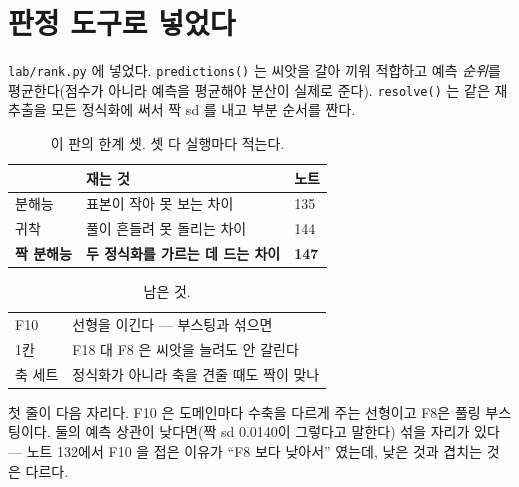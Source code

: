 \documentclass[10pt]{article}
\begin{document}


\section{판정 도구로 넣었다}

\texttt{lab/rank.py} 에 넣었다. \texttt{predictions()} 는 씨앗을 갈아
끼워 적합하고 예측 \emph{순위}를 평균한다(점수가 아니라 예측을 평균해야
분산이 실제로 준다). \texttt{resolve()} 는 같은 재추출을 모든 정식화에
써서 짝 sd 를 내고 부분 순서를 짠다.

\begin{table}[t]
\centering\tsize
\caption{이 판의 한계 셋. 셋 다 실행마다 적는다.}
\begin{tabular}{lll}
\toprule
& 재는 것 & 노트 \\
\midrule
분해능 & 표본이 작아 못 보는 차이 & 135 \\
귀착 & 풀이 흔들려 못 돌리는 차이 & 144 \\
\textbf{짝 분해능} & \textbf{두 정식화를 가르는 데 드는 차이} & \textbf{147} \\
\bottomrule
\end{tabular}
\end{table}

\begin{table}[t]
\centering\tsize
\caption{남은 것.}
\begin{tabular}{ll}
\toprule
F10 & 선형을 이긴다 --- 부스팅과 섞으면 \\
1칸 & F18 대 F8 은 씨앗을 늘려도 안 갈린다 \\
축 세트 & 정식화가 아니라 축을 견줄 때도 짝이 맞나 \\
\bottomrule
\end{tabular}
\end{table}

첫 줄이 다음 자리다. F10 은 도메인마다 수축을 다르게 주는 선형이고 F8은
풀링 부스팅이다. 둘의 예측 상관이 낮다면(짝 sd 0.0140이 그렇다고 말한다)
섞을 자리가 있다 --- 노트 132에서 F10 을 접은 이유가 ``F8 보다 낮아서''
였는데, 낮은 것과 겹치는 것은 다르다.
\end{document}
